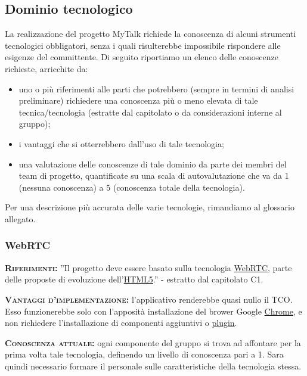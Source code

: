 \subsection{Dominio tecnologico}
La realizzazione del progetto MyTalk richiede la conoscenza di alcuni strumenti tecnologici obbligatori, senza i quali risulterebbe impossibile rispondere alle esigenze del committente. Di seguito riportiamo un elenco delle conoscenze richieste, arricchite da:

\begin{itemize}
	\item uno o più riferimenti alle parti che potrebbero (sempre in termini di analisi preliminare) richiedere una conoscenza più o meno elevata di tale tecnica/tecnologia (estratte dal capitolato o da considerazioni interne al gruppo);
	\item i vantaggi che si otterrebbero dall'uso di tale tecnologia;
	\item una valutazione delle conoscenze di tale dominio da parte dei membri del team di progetto, quantificate su una scala di autovalutazione che va da 1 (nessuna conoscenza) a 5 (conoscenza totale della tecnologia).
\end{itemize}
Per una descrizione più accurata delle varie tecnologie, rimandiamo al glossario allegato.

\subsubsection{WebRTC}
\begin{description}
	\item{\scshape\bfseries Riferimenti:} ''Il progetto deve essere basato sulla tecnologia \underline{WebRTC}, parte delle proposte di evoluzione dell'\underline{HTML5}.'' - estratto dal capitolato C1.

	\item{\scshape\bfseries Vantaggi d'implementazione:} l'applicativo renderebbe quasi nullo il TCO. Esso funzionerebbe solo con l'apposità installazione del brower Google \underline{Chrome}, e non richiedere l'installazione di componenti aggiuntivi o \underline{plugin}.
	
	\item{\scshape\bfseries Conoscenza attuale:} ogni componente del gruppo si trova ad affontare per la prima volta tale tecnologia, definendo un livello di conoscenza pari a 1. Sara quindi necessario formare il personale sulle caratteristiche della tecnologia stessa.
\end{description}

